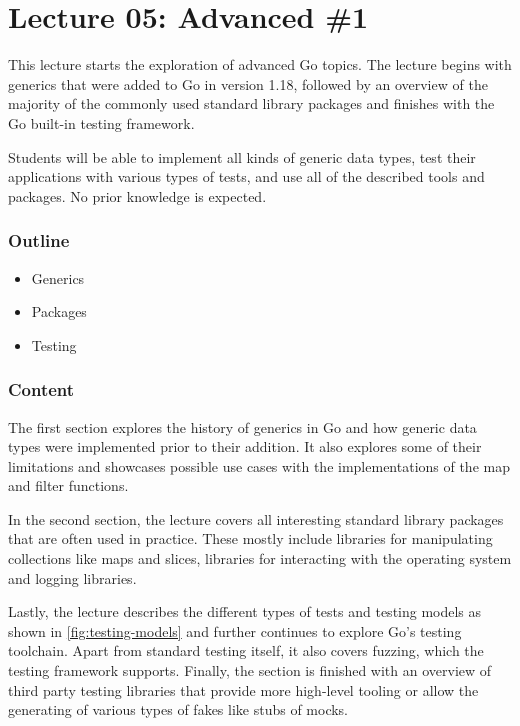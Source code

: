 \documentclass[
  digital,
  color,
  oneside,
  nosansbold,
  nocolorbold,
  nolof,
  nolot,
]{fithesis4}
\begin{document}
\section{Lecture 05: Advanced \#1}

This lecture starts the exploration of advanced Go topics. The lecture begins with generics that were added to Go in version 1.18, followed by an overview of the majority of the commonly used standard library packages and finishes with the Go built-in testing framework.

Students will be able to implement all kinds of generic data types, test their applications with various types of tests, and use all of the described tools and packages. No prior knowledge is expected.

\subsubsection{Outline}

\begin{itemize}
    \item Generics
    \item Packages
    \item Testing
\end{itemize}

\subsubsection{Content}

The first section explores the history of generics in Go and how generic data types were implemented prior to their addition. It also explores some of their limitations and showcases possible use cases with the implementations of the map and filter functions.

In the second section, the lecture covers all interesting standard library packages that are often used in practice. These mostly include libraries for manipulating collections like maps and slices, libraries for interacting with the operating system and logging libraries.

Lastly, the lecture describes the different types of tests and testing models as shown in \cref{fig:testing-models} and further continues to explore Go's testing toolchain. Apart from standard testing itself, it also covers fuzzing, which the testing framework supports. Finally, the section is finished with an overview of third party testing libraries that provide more high-level tooling or allow the generating of various types of fakes like stubs of mocks.
\end{document}

